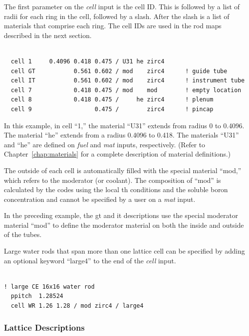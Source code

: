 The first parameter on the {\it cell} input is the cell ID.
This is followed by a list of radii for each ring in the cell, followed by a slash.
After the slash is a list of materials that comprise each ring.
The cell IDs are used in the rod maps described in the next section.

\begin{Verbatim}[fontsize=\small]

  cell 1     0.4096 0.418 0.475 / U31 he zirc4
  cell GT           0.561 0.602 / mod    zirc4      ! guide tube
  cell IT           0.561 0.602 / mod    zirc4      ! instrument tube
  cell 7            0.418 0.475 / mod    mod        ! empty location
  cell 8            0.418 0.475 /     he zirc4      ! plenum
  cell 9                  0.475 /        zirc4      ! pincap

\end{Verbatim}

In this example, in cell ``1,'' the material ``U31'' extends from radius 0 to 0.4096.
The material ``he'' extends from a radius 0.4096 to 0.418.
The materials ``U31''  and ``he'' are defined on {\it fuel} and {\it mat} inputs, respectively.
(Refer to Chapter~\ref{chap:materials} for a complete description of material definitions.)

The outside of each cell is automatically filled with the special material ``mod,'' which
refers to the moderator (or coolant).
The composition of ``mod'' is calculated by the codes using the local \ac{th} conditions and the
soluble boron concentration and cannot be specified by a user on a {\it mat} input.

In the preceding example, the \ac{gt} and \ac{it} descriptions
use the special moderator material ``mod'' to define the moderator material on both
the inside and outside of the tubes.

Large water rods that span more than one lattice cell can be specified by adding an optional keyword ``large4''
to the end of the {\it cell} input.
\begin{Verbatim}[fontsize=\small]

! large CE 16x16 water rod
  ppitch  1.28524
  cell WR 1.26 1.28 / mod zirc4 / large4

\end{Verbatim}

\subsubsection{Lattice Descriptions}

